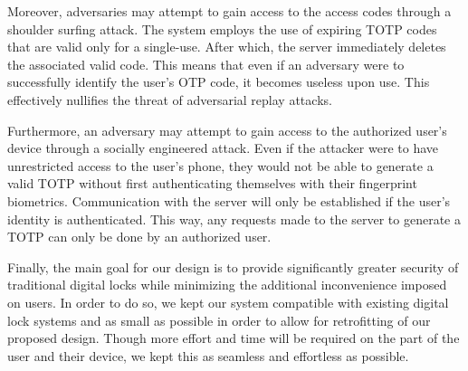 \documentclass[conference]{IEEEtran}
\begin{document}
Moreover, adversaries may attempt to gain access to the access codes through a shoulder surfing attack. The system employs the use of expiring TOTP codes that are valid only for a single-use. After which, the server immediately deletes the associated valid code. This means that even if an adversary were to successfully identify the user’s OTP code, it becomes useless upon use. This effectively nullifies the threat of adversarial replay attacks.

	Furthermore, an adversary may attempt to gain access to the authorized user’s device through a socially engineered attack. Even if the attacker were to have unrestricted access to the user’s phone, they would not be able to generate a valid TOTP without first authenticating themselves with their fingerprint biometrics. Communication with the server will only be established if the user’s identity is authenticated. This way, any requests made to the server to generate a TOTP can only be done by an authorized user.
	
	Finally, the main goal for our design is to provide significantly greater security of traditional digital locks while minimizing the additional inconvenience imposed on users. In order to do so, we kept our system compatible with existing digital lock systems and as small as possible in order to allow for retrofitting of our proposed design. Though more effort and time will be required on the part of the user and their device, we kept this as seamless and effortless as possible. 
\end{document}
